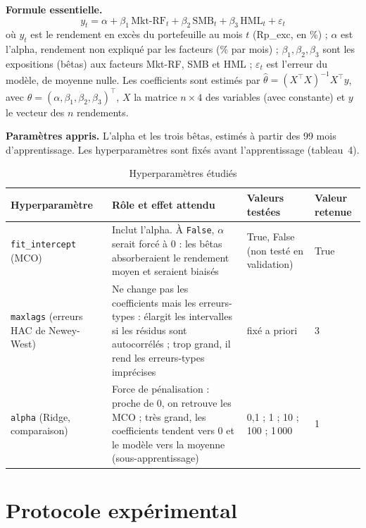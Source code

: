 \documentclass[11pt,a4paper]{article}
\newcommand{\mkt}{Mkt-RF}
\begin{document}
\textbf{Formule essentielle.}
\begin{equation}
y_t = \alpha + \beta_1\,\mathrm{Mkt\text{-}RF}_t + \beta_2\,\mathrm{SMB}_t + \beta_3\,\mathrm{HML}_t + \varepsilon_t
\end{equation}
où $y_t$ est le rendement en excès du portefeuille au mois $t$ (Rp\_exc, en \%) ; $\alpha$ est l'alpha, rendement non expliqué par les facteurs (\% par mois) ; $\beta_1,\beta_2,\beta_3$ sont les expositions (bêtas) aux facteurs \mkt, SMB et HML ; $\varepsilon_t$ est l'erreur du modèle, de moyenne nulle. Les coefficients sont estimés par $\hat{\theta}=(X^\top X)^{-1}X^\top y$, avec $\theta=(\alpha,\beta_1,\beta_2,\beta_3)^\top$, $X$ la matrice $n\times 4$ des variables (avec constante) et $y$ le vecteur des $n$ rendements.

\textbf{Paramètres appris.} L'alpha et les trois bêtas, estimés à partir des 99 mois d'apprentissage. Les hyperparamètres sont fixés avant l'apprentissage (tableau~4).

\begin{table}[H]
\centering
\caption{Hyperparamètres étudiés}
\small
\begin{tabularx}{\textwidth}{|p{3cm}|X|p{2.4cm}|p{1.8cm}|}
\hline
\textbf{Hyperparamètre} & \textbf{Rôle et effet attendu} & \textbf{Valeurs testées} & \textbf{Valeur retenue}\\\hline
\texttt{fit\_intercept} (MCO) & Inclut l'alpha. À \texttt{False}, $\alpha$ serait forcé à 0 : les bêtas absorberaient le rendement moyen et seraient biaisés & True, False (non testé en validation) & True\\\hline
\texttt{maxlags} (erreurs HAC de Newey-West) & Ne change pas les coefficients mais les erreurs-types : élargit les intervalles si les résidus sont autocorrélés ; trop grand, il rend les erreurs-types imprécises & fixé a priori & 3\\\hline
\texttt{alpha} (Ridge, comparaison) & Force de pénalisation : proche de 0, on retrouve les MCO ; très grand, les coefficients tendent vers 0 et le modèle vers la moyenne (sous-apprentissage) & 0,1 ; 1 ; 10 ; 100 ; 1\,000 & 1\\\hline
\end{tabularx}
\end{table}

\section{Protocole expérimental}
\end{document}

